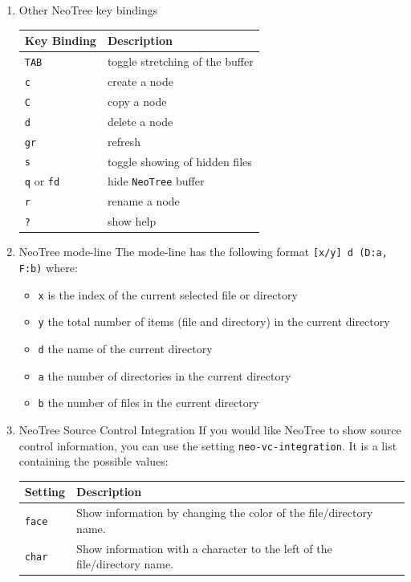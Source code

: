 \documentclass[11pt]{article}
\begin{document}
\begin{enumerate}
\item Other NeoTree key bindings
\label{sec:org8232a70}

\begin{center}
\begin{tabular}{ll}
Key Binding & Description\\
\hline
\texttt{TAB} & toggle stretching of the buffer\\
\texttt{c} & create a node\\
\texttt{C} & copy a node\\
\texttt{d} & delete a node\\
\texttt{gr} & refresh\\
\texttt{s} & toggle showing of hidden files\\
\texttt{q} or \texttt{fd} & hide \texttt{NeoTree} buffer\\
\texttt{r} & rename a node\\
\texttt{?} & show help\\
\end{tabular}
\end{center}

\item NeoTree mode-line
\label{sec:org3838ad4}
The mode-line has the following format \texttt{[x/y] d (D:a, F:b)} where:
\begin{itemize}
\item \texttt{x} is the index of the current selected file or directory
\item \texttt{y} the total number of items (file and directory) in the current directory
\item \texttt{d} the name of the current directory
\item \texttt{a} the number of directories in the current directory
\item \texttt{b} the number of files in the current directory
\end{itemize}

\item NeoTree Source Control Integration
\label{sec:orgf7a1788}
If you would like NeoTree to show source control information, you can use the
setting \texttt{neo-vc-integration}. It is a list containing the possible values:

\begin{center}
\begin{tabular}{ll}
Setting & Description\\
\hline
\texttt{face} & Show information by changing the color of the file/directory name.\\
\texttt{char} & Show information with a character to the left of the file/directory name.\\
\end{tabular}
\end{center}


\end{enumerate}
\end{document}
